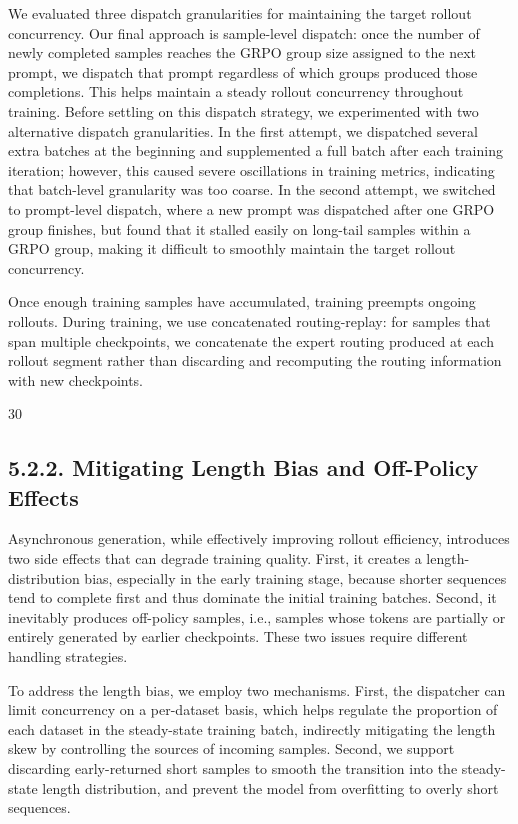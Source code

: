 \documentclass[
  10
]{article}
\begin{document}
We evaluated three dispatch granularities for maintaining the target
rollout concurrency. Our final approach is sample-level dispatch: once
the number of newly completed samples reaches the GRPO group size
assigned to the next prompt, we dispatch that prompt regardless of which
groups produced those completions. This helps maintain a steady rollout
concurrency throughout training. Before settling on this dispatch
strategy, we experimented with two alternative dispatch granularities.
In the first attempt, we dispatched several extra batches at the
beginning and supplemented a full batch after each training iteration;
however, this caused severe oscillations in training metrics, indicating
that batch-level granularity was too coarse. In the second attempt, we
switched to prompt-level dispatch, where a new prompt was dispatched
after one GRPO group finishes, but found that it stalled easily on
long-tail samples within a GRPO group, making it difficult to smoothly
maintain the target rollout concurrency.

Once enough training samples have accumulated, training preempts ongoing
rollouts. During training, we use concatenated routing-replay: for
samples that span multiple checkpoints, we concatenate the expert
routing produced at each rollout segment rather than discarding and
recomputing the routing information with new checkpoints.

30

\subsection{5.2.2. Mitigating Length Bias and Off-Policy
Effects}\label{mitigating-length-bias-and-off-policy-effects}

Asynchronous generation, while effectively improving rollout efficiency,
introduces two side effects that can degrade training quality. First, it
creates a length-distribution bias, especially in the early training
stage, because shorter sequences tend to complete first and thus
dominate the initial training batches. Second, it inevitably produces
off-policy samples, i.e., samples whose tokens are partially or entirely
generated by earlier checkpoints. These two issues require different
handling strategies.

To address the length bias, we employ two mechanisms. First, the
dispatcher can limit concurrency on a per-dataset basis, which helps
regulate the proportion of each dataset in the steady-state training
batch, indirectly mitigating the length skew by controlling the sources
of incoming samples. Second, we support discarding early-returned short
samples to smooth the transition into the steady-state length
distribution, and prevent the model from overfitting to overly short
sequences.
\end{document}
